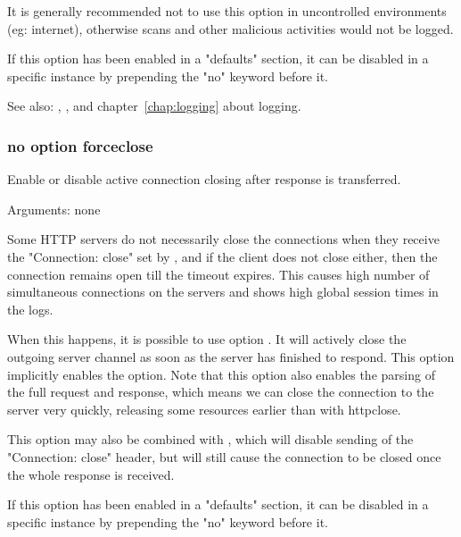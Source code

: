   It is generally recommended not to use this option in uncontrolled
  environments (eg: internet), otherwise scans and other malicious activities
  would not be logged.

  If this option has been enabled in a "defaults" section, it can be disabled
  in a specific instance by prepending the "no" keyword before it.


See also: , ,  and chapter~\ref{chap:logging} about logging.

\subsubsection[forceclose]{}
\subsubsection*{no option forceclose}


  Enable or disable active connection closing after response is transferred.


  Arguments: none

  Some HTTP servers do not necessarily close the connections when they receive
  the "Connection: close" set by , and if the client does not
  close either, then the connection remains open till the timeout expires. This
  causes high number of simultaneous connections on the servers and shows high
  global session times in the logs.

  When this happens, it is possible to use option . It will
  actively close the outgoing server channel as soon as the server has finished
  to respond. This option implicitly enables the  option. Note that
  this option also enables the parsing of the full request and response, which
  means we can close the connection to the server very quickly, releasing some
  resources earlier than with httpclose.

  This option may also be combined with , which
  will disable sending of the "Connection: close" header, but will still cause
  the connection to be closed once the whole response is received.

  If this option has been enabled in a "defaults" section, it can be disabled
  in a specific instance by prepending the "no" keyword before it.


